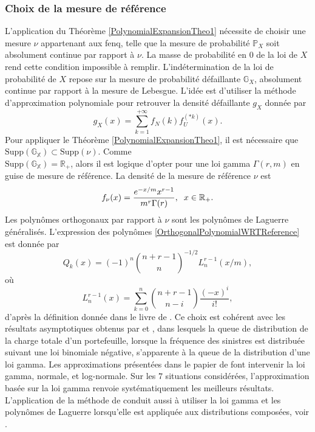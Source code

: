 \subsubsection{Choix de la mesure de référence}
L'application du Théorème \ref{PolynomialExpansionTheo1} nécessite de choisir une mesure $\nu$ appartenant aux \gls{fenq}, telle que la mesure de probabilité $\mathbb{P}_{X}$ soit absolument continue par rapport à $\nu$. La masse de probabilité en $0$ de la loi de $X$ rend cette condition impossible à remplir. L'indétermination de la loi de probabilité de $X$ repose sur la mesure de probabilité défaillante $\mathbb{G}_{X}$, absolument continue par rapport à la mesure de Lebesgue. L'idée est d'utiliser la méthode d'approximation polynomiale pour retrouver
la densité défaillante $g_{X}$ donnée par 
\begin{equation}\label{DensityCompoundDistribution}
g_{X}(x)=\sum_{k=1}^{+\infty}f_{N}(k)f_{U}^{\left(*k\right)}(x).
\end{equation}
Pour appliquer le Théorème \ref{PolynomialExpansionTheo1}, il est nécessaire que   $\text{Supp}\left(\mathbb{G_{X}}\right)\subset\text{Supp}\left(\nu\right)$. Comme\\ $\text{Supp}\left(\mathbb{G_{X}}\right)=\mathbb{R}_{+}$, alors il est logique d'opter pour une loi gamma $\Gamma(r,m)$ en guise de mesure de référence. La densité de la mesure de référence $\nu$ est 
\begin{equation}\label{DensityReferenceMeasureGamma}
f_{\nu}(x)=\frac{e^{-x/m}x^{r-1}}{m^{r}\Gamma(r)},\hspace{0.2cm}x\in\mathbb{R}_{+}.
\end{equation}
Les polynômes orthogonaux par rapport à $\nu$ sont les polynômes de Laguerre généralisés. L\rq{}expression des polynômes \eqref{OrthogonalPolynomialWRTReference} est donnée par
\begin{equation}\label{OrthonormalLaguerrePolynomial}
Q_{k}(x)=(-1)^{n}\binom{n+r-1}{n}^{-1/2}L_{n}^{r-1}(x/m),
\end{equation}
où
\begin{equation}\label{LaguerrePolynomialSzego}
L_{n}^{r-1}(x)=\sum_{k=0}^{n}\binom{n+r-1}{n-i}\frac{(-x)^{i}}{i!},
\end{equation}
d'après la définition donnée dans le livre de \citet{Sz39}. Ce choix est cohérent avec les résultats asymptotiques obtenus par \citet{Su82} et \citet{EmMaTe85}, dans lesquels la queue de distribution de la charge totale d'un portefeuille, lorsque la fréquence des sinistres est distribuée suivant une loi binomiale négative, s'apparente à la queue de la distribution d'une loi gamma. Les approximations présentées dans le papier de \citet{PaPaPo01} font intervenir la loi gamma, normale, et log-normale. Sur les $7$ situations considérées, l'approximation basée sur la loi gamma renvoie systématiquement les meilleurs résultats. L'application de la méthode de \citet{Pr05} conduit aussi à utiliser la loi gamma et les polynômes de Laguerre lorsqu'elle est appliquée aux distributions composées, voir \citet{JiPrRe14}.\\

